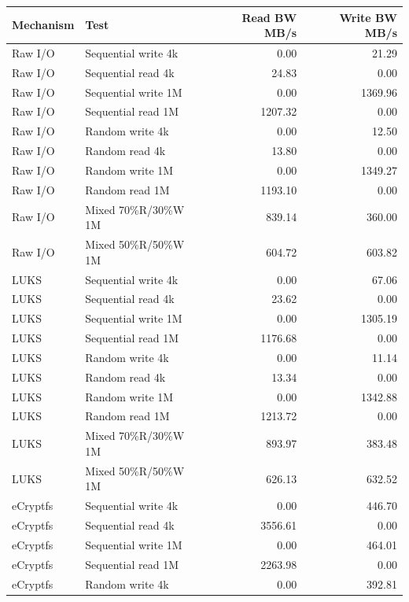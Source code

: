 \documentclass[a4paper]{article}
\begin{document}
\begin{table}[H]
    \centering
    \small
    \begin{tabular}{|l|l|r|r|}
        \hline
        Mechanism & Test & Read BW MB/s & Write BW MB/s \\
        \hline
        Raw I/O & Sequential write 4k & 0.00 & 21.29 \\
        Raw I/O & Sequential read 4k & 24.83 & 0.00 \\
        Raw I/O & Sequential write 1M & 0.00 & 1369.96 \\
        Raw I/O & Sequential read 1M & 1207.32 & 0.00 \\
        Raw I/O & Random write 4k & 0.00 & 12.50 \\
        Raw I/O & Random read 4k & 13.80 & 0.00 \\
        Raw I/O & Random write 1M & 0.00 & 1349.27 \\
        Raw I/O & Random read 1M & 1193.10 & 0.00 \\
        Raw I/O & Mixed 70\%R/30\%W 1M & 839.14 & 360.00 \\
        Raw I/O & Mixed 50\%R/50\%W 1M & 604.72 & 603.82 \\
        LUKS & Sequential write 4k & 0.00 & 67.06 \\
        LUKS & Sequential read 4k & 23.62 & 0.00 \\
        LUKS & Sequential write 1M & 0.00 & 1305.19 \\
        LUKS & Sequential read 1M & 1176.68 & 0.00 \\
        LUKS & Random write 4k & 0.00 & 11.14 \\
        LUKS & Random read 4k & 13.34 & 0.00 \\
        LUKS & Random write 1M & 0.00 & 1342.88 \\
        LUKS & Random read 1M & 1213.72 & 0.00 \\
        LUKS & Mixed 70\%R/30\%W 1M & 893.97 & 383.48 \\
        LUKS & Mixed 50\%R/50\%W 1M & 626.13 & 632.52 \\
        eCryptfs & Sequential write 4k  & 0.00 & 446.70 \\
        eCryptfs & Sequential read 4k  & 3556.61 & 0.00 \\
        eCryptfs & Sequential write 1M  & 0.00 & 464.01 \\
        eCryptfs & Sequential read 1M  & 2263.98 & 0.00 \\
        eCryptfs & Random write 4k  & 0.00 & 392.81 \\

\end{tabular}
\end{table}
\end{document}
